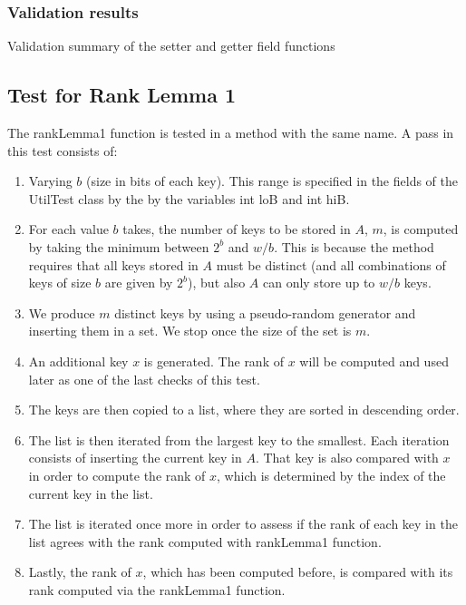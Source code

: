 \subsubsection{Validation results}

\begin{table}[H]
\centering

\caption{Validation summary of the setter and getter field functions}
\label{tab:setGetFieldValidation}
\end{table}

\subsection{Test for Rank Lemma 1}
The {\ttfamily rankLemma1} function is tested in a method with the same name.
A pass in this test consists of:
\begin{enumerate}
    \item
    Varying $b$ (size in bits of each key). This range is specified in the fields of the {\ttfamily UtilTest} class by the by the variables {\ttfamily int loB} and {\ttfamily int hiB}.
    
    \item
    For each value $b$ takes, the number of keys to be stored in $A$, $m$, is computed by taking the minimum between $2^b$ and $w/b$. This is because the method requires that all keys stored in $A$ must be distinct (and all combinations of keys of size $b$ are given by $2^b$), but also $A$ can only store up to $w/b$ keys.
    
    \item
    We produce $m$ distinct keys by using a pseudo-random generator and inserting them in a set. We stop once the size of the set is $m$.
    
    \item
    An additional key $x$ is generated. The rank of $x$ will be computed and used later as one of the last checks of this test.
    
    \item
    The keys are then copied to a list, where they are sorted in descending order.
    
    \item
    The list is then iterated from the largest key to the smallest. Each iteration consists of inserting the current key in $A$. That key is also compared with $x$ in order to compute the rank of $x$, which is determined by the index of the current key in the list.
    
    \item
    The list is iterated once more in order to assess if the rank of each key in the list agrees with the rank computed with {\ttfamily rankLemma1} function.
    
    \item
    Lastly, the rank of $x$, which has been computed before, is compared with its rank computed via the {\ttfamily rankLemma1} function.
\end{enumerate}

